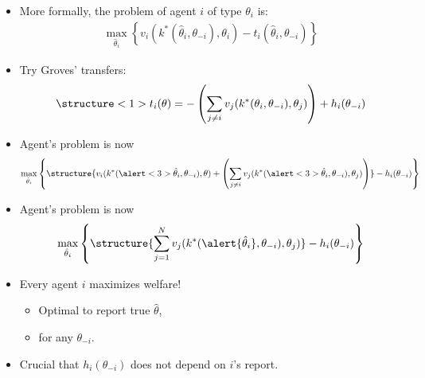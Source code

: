 \documentclass[english]{beamer}		%
\def\lyxframeend{} %
\begin{document}
\begin{itemize}
	\item More formally, the problem of agent $i$ of type $\theta_i$ is:
		\vspace{-0.5em}\begin{align*}
		\max_{\hat{\theta}_i} \left\{  v_i(k^*(\hat{\theta}_i,\theta_{-i}),\theta_i) - t_i(\hat{\theta}_i,\theta_{-i}) \right\}
		\end{align*}\vspace{-1em}
	\item Try \alert<1>{Groves' transfers}:
		\vspace{-0.5em}\begin{align*}
		\structure<1>{ t_{i}(\theta)=-\left(\sum_{j\neq i} v_{j}(k^*(\theta_i, \theta_{-i}), \theta_{j}) \right) + h_{i}(\theta_{-i}) }
		\end{align*}\vspace{-1em}
	\pause
	\item Agent's problem is now
		\vspace{-0.5em}\begin{align*}
		\max_{\hat{\theta}_i} \left\{ \structure{v_i(k^*(\alert<3>{\hat{\theta}_i},\theta_{-i}),\theta) + \left( \sum_{j\neq i} v_{j}(k^*(\alert<3>{\hat{\theta}_i},\theta_{-i}), \theta_{j}) \right)} - h_{i}(\theta_{-i}) \right\}
		\end{align*}\vspace{-1em}
\end{itemize}
\lyxframeend


\begin{itemize}
	\item Agent's problem is now
		\vspace{-0.5em}\begin{align*}
		\max_{\hat{\theta}_i} \left\{ \structure{ \sum_{j=1}^N v_{j}(k^*(\alert{\hat{\theta}_i},\theta_{-i}), \theta_{j}) } - h_{i}(\theta_{-i}) \right\}
		\end{align*}\vspace{-1em}
	\item Every agent $i$ maximizes welfare!
	\begin{itemize}
		\item Optimal to report true $\hat{\theta}$,
		\item for any $\theta_{-i}$.
	\end{itemize}
	\item Crucial that $h_i(\theta_{-i})$ does not depend on $i$'s report.
\end{itemize}
\lyxframeend
\end{document}
